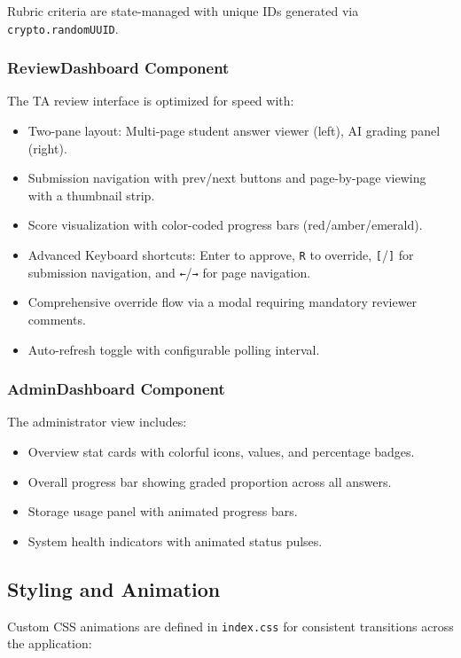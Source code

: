 \documentclass[11pt,a4paper]{article}
\begin{document}
Rubric criteria are state-managed with unique IDs generated via \texttt{crypto.randomUUID}.

\subsubsection{ReviewDashboard Component}
The TA review interface is optimized for speed with:

\begin{itemize}[leftmargin=2em]
    \item Two-pane layout: Multi-page student answer viewer (left), AI grading panel (right).
    \item Submission navigation with prev/next buttons and page-by-page viewing with a thumbnail strip.
    \item Score visualization with color-coded progress bars (red/amber/emerald).
    \item Advanced Keyboard shortcuts: Enter to approve, \texttt{R} to override, \texttt{[}/\texttt{]} for submission navigation, and \texttt{←}/\texttt{→} for page navigation.
    \item Comprehensive override flow via a modal requiring mandatory reviewer comments.
    \item Auto-refresh toggle with configurable polling interval.
\end{itemize}

\subsubsection{AdminDashboard Component}
The administrator view includes:

\begin{itemize}[leftmargin=2em]
    \item Overview stat cards with colorful icons, values, and percentage badges.
    \item Overall progress bar showing graded proportion across all answers.
    \item Storage usage panel with animated progress bars.
    \item System health indicators with animated status pulses.
\end{itemize}

\subsection{Styling and Animation}
Custom CSS animations are defined in \texttt{index.css} for consistent transitions across the application:
\end{document}
